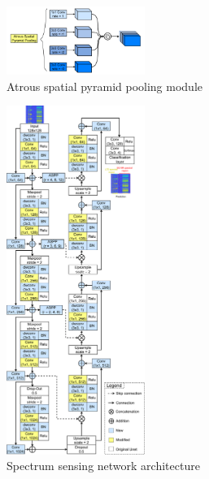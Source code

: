\documentclass[journal]{IEEEtran} %
\begin{document}
\begin{figure}[!t]
    \centering
    \includegraphics[width=0.4\textwidth]{img/Design-ASPP.pdf}
    \caption{Atrous spatial pyramid pooling module}
    \label{fig3}
\end{figure}

\begin{figure}[!t]
    \centering
    \includegraphics[width=0.4\textwidth]{img/Design-SpecSenseNet.pdf}
    \caption{Spectrum sensing network architecture}
    \label{fig4}
\end{figure}
\end{document}
